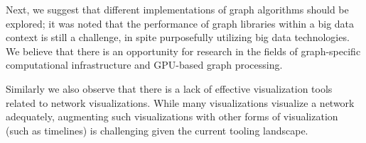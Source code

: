 \documentclass[10pt,journal,final,a4paper]{IEEEtran}
\begin{document}
Next, we suggest that different implementations of graph algorithms should be explored; it was noted that the performance of graph libraries within a big data context is still a challenge, in spite purposefully utilizing big data technologies. We believe that there is an opportunity for research in the fields of graph-specific computational infrastructure and GPU-based graph processing.

Similarly we also observe that there is a lack of effective visualization tools related to network visualizations. While many visualizations visualize a network adequately, augmenting such visualizations with other forms of visualization (such as timelines) is challenging given the current tooling landscape.






\clearpage
\end{document}
